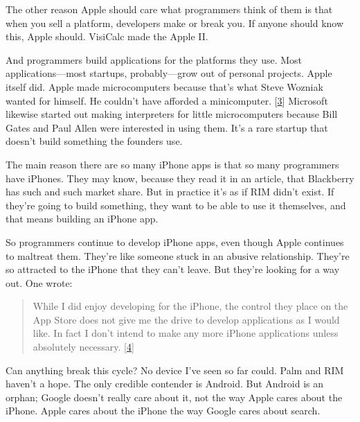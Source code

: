                   The other reason Apple should care what programmers think of
                  them is that when you sell a platform, developers make or
                  break you. If anyone should know this, Apple should. VisiCalc
                  made the Apple II.

And programmers build
                  applications for the platforms they use. Most
                  applications---most startups, probably---grow out of
                  personal projects. Apple itself did. Apple made microcomputers
                  because that's what Steve Wozniak wanted for himself. He
                  couldn't have afforded a minicomputer.
                  [\href{\#f3n}{3}]
                  Microsoft likewise started out making interpreters for little
                  microcomputers because Bill Gates and Paul Allen were
                  interested in using them. It's a rare startup that doesn't
                  build something the founders use.

The main reason
                  there are so many iPhone apps is that so many programmers have
                  iPhones. They may know, because they read it in an article,
                  that Blackberry has such and such market share. But in
                  practice it's as if RIM didn't exist. If they're going to
                  build something, they want to be able to use it themselves,
                  and that means building an iPhone app.

So
                  programmers continue to develop iPhone apps, even though Apple
                  continues to maltreat them. They're like someone stuck in an
                  abusive relationship. They're so attracted to the iPhone that
                  they can't leave. But they're looking for a way out. One
                  wrote:
                  \begin{quote}

                    While I did enjoy developing for the iPhone, the control
                    they place on the App Store does not give me the drive to
                    develop applications as I would like. In fact I don't intend
                    to make any more iPhone applications unless absolutely
                    necessary.
                    [\href{\#f4n}{4}]
                  
\end{quote}

                  Can anything break this cycle? No device I've seen so far
                  could. Palm and RIM haven't a hope. The only credible
                  contender is Android. But Android is an orphan; Google doesn't
                  really care about it, not the way Apple cares about the
                  iPhone. Apple cares about the iPhone the way Google cares
                  about search.


